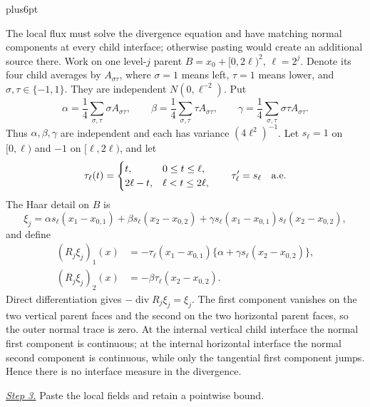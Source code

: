 \documentclass[11pt,reqno]{amsart}
\makeatletter
\theoremstyle{plain}
\theoremstyle{definition}
\theoremstyle{remark}
\renewenvironment{proof}[1][\proofname]{%
  \par
  \pushQED{\qed}%
  \normalfont
  \topsep6pt plus6pt\relax
  \trivlist
  \item[\hskip\labelsep\slshape #1\@addpunct{.}]%
  \ignorespaces
}{%
  \popQED
  \endtrivlist
  \@endpefalse
}
\DeclareRobustCommand{\qed}{%
  \leavevmode\unskip\penalty9999\hbox{}\nobreak
  \ifmmode
    \makebox[0pt][l]{\qquad\hbox{\qedsymbol}}%
  \else
    \qquad\hbox{\qedsymbol}%
  \fi
}
\renewcommand{\qedsymbol}{\rule[.47pt]{4pt}{6pt}}
\numberwithin{equation}{section}
\newcommand{\1}{\mathbf 1}
\makeatother
\begin{document}
\begin{proof}
The local flux must solve the divergence equation and have matching
normal components at every child interface; otherwise pasting would
create an additional source there.  Work on one level-$j$ parent
$B=x_ 0+[0,2\ell)^2$, $\ell=2^j$.  Denote its four child averages by
$A_ {\sigma\tau}$, where $\sigma=1$ means left, $\tau=1$ means lower,
and $\sigma,\tau\in\{-1,1\}$.  They are independent
$N(0,\ell^{-2})$.  Put
\begin{equation*}
\alpha=\frac14\sum_ {\sigma,\tau}\sigma A_ {\sigma\tau},\qquad
\beta =\frac14\sum_ {\sigma,\tau}\tau A_ {\sigma\tau},\qquad
\gamma=\frac14\sum_ {\sigma,\tau}\sigma\tau A_ {\sigma\tau}.
\end{equation*}
Thus $\alpha,\beta,\gamma$ are independent and each has variance
$(4\ell^2)^{-1}$.  Let $s_ \ell=1$ on $[0,\ell)$ and $-1$ on
$[\ell,2\ell)$, and let
\begin{equation*}
\tau_ \ell(t)=\begin{cases}t,&0\leq t\leq\ell,\\
2\ell-t,&\ell<t\leq2\ell,
\end{cases}
\qquad \tau_ \ell'=s_ \ell\quad\hbox{a.e.}
\end{equation*}
The Haar detail on $B$ is
\begin{equation*}
\xi_ j=\alpha s_ \ell(x_ 1-x_ {0,1})+\beta s_ \ell(x_ 2-x_ {0,2})
+\gamma s_ \ell(x_ 1-x_ {0,1})s_ \ell(x_ 2-x_ {0,2}),
\end{equation*}
and define
\begin{equation}
\begin{split}
(R_ j\xi_ j)_ 1(x)&=-\tau_ \ell(x_ 1-x_ {0,1})
\{\alpha+\gamma s_ \ell(x_ 2-x_ {0,2})\},\\
(R_ j\xi_ j)_ 2(x)&=-\beta\tau_ \ell(x_ 2-x_ {0,2}).
\end{split}
\tag{12a}
\end{equation}
Direct differentiation gives $-\operatorname {div}R_ j\xi_ j=\xi_ j$.
The first component vanishes on the two vertical parent faces and the
second on the two horizontal parent faces, so the outer normal trace is
zero.  At the internal vertical child interface the normal first
component is continuous; at the internal horizontal interface the normal
second component is continuous, while only the tangential first component
jumps.  Hence there is no interface measure in the divergence.

\smallskip\noindent
\underline{\textit{Step 3.}} Paste the local fields and retain a pointwise bound.


\end{proof}
\end{document}
